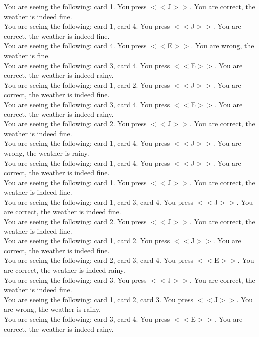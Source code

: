 \documentclass[pdflatex,sn-nature]{sn-jnl}%
\theoremstyle{thmstyleone}%
\theoremstyle{thmstyletwo}%
\theoremstyle{thmstylethree}%
\begin{document}
You are seeing the following: card 1. You press $<<$J$>>$. You are correct, the weather is indeed fine. $~$\\ 
You are seeing the following: card 1, card 4. You press $<<$J$>>$. You are correct, the weather is indeed fine. $~$\\ 
You are seeing the following: card 4. You press $<<$E$>>$. You are wrong, the weather is fine. $~$\\ 
You are seeing the following: card 3, card 4. You press $<<$E$>>$. You are correct, the weather is indeed rainy. $~$\\ 
You are seeing the following: card 1, card 2. You press $<<$J$>>$. You are correct, the weather is indeed fine. $~$\\ 
You are seeing the following: card 3, card 4. You press $<<$E$>>$. You are correct, the weather is indeed rainy. $~$\\ 
You are seeing the following: card 2. You press $<<$J$>>$. You are correct, the weather is indeed fine. $~$\\ 
You are seeing the following: card 1, card 4. You press $<<$J$>>$. You are wrong, the weather is rainy. $~$\\ 
You are seeing the following: card 1, card 4. You press $<<$J$>>$. You are correct, the weather is indeed fine. $~$\\ 
You are seeing the following: card 1. You press $<<$J$>>$. You are correct, the weather is indeed fine. $~$\\ 
You are seeing the following: card 1, card 3, card 4. You press $<<$J$>>$. You are correct, the weather is indeed fine. $~$\\ 
You are seeing the following: card 2. You press $<<$J$>>$. You are correct, the weather is indeed fine. $~$\\ 
You are seeing the following: card 1, card 2. You press $<<$J$>>$. You are correct, the weather is indeed fine. $~$\\ 
You are seeing the following: card 2, card 3, card 4. You press $<<$E$>>$. You are correct, the weather is indeed rainy. $~$\\ 
You are seeing the following: card 3. You press $<<$J$>>$. You are correct, the weather is indeed fine. $~$\\ 
You are seeing the following: card 1, card 2, card 3. You press $<<$J$>>$. You are wrong, the weather is rainy. $~$\\ 
You are seeing the following: card 3, card 4. You press $<<$E$>>$. You are correct, the weather is indeed rainy. $~$\\ 
\end{document}
